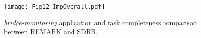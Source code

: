 \begin{figure}[t]
    \centering
    \texttt{[image: Fig12\_ImpOverall.pdf]}
    \vspace{-20pt}
    \caption{\emph{bridge-monitoring} application and task completeness comparison between REMARK and SDRB.}
    \vspace{-5pt}
    \label{fig:ImpOverall}
    \vspace{-0pt}
\end{figure}

\begin{comment}
%
\begin{figure}[t]
    \centering
    \texttt{[image: Fig12\_ImpRecover.pdf]}
    \vspace{-10pt}
    \caption{Performance comparison of REMARK and REMARK by executing \emph{bridge-monitoring} for $2$ minutes on NVnode.}
    \label{fig:ImpRecoverEvaluate}
    \vspace{-0pt}
\end{figure}

\begin{comment}
{To decouple the effect of outage rates, Fig.}~\ref{fig:ImpRecoverEvaluate}{ (a) shows an example of a typical recover procedure after one power failure, where REMARK reduces the recovery overhead by 61.8\%.}
 
\textbf{Re-initialization overhead} 
        Compared with the \emph{`init-all'} strategy in QuickRecall, REMARK reduces the re-initialization overhead from 55\% to 11\% with the \emph{`init-used'} strategy.

\textbf{B/R overhead} 
        B/R overhead represents the backup/restore overhead. Using hardware B/R functions, REMARK incurs negligible B/R time overhead.
     
\textbf{Rollback overhead} 
        The rollback overhead is a random scaled overhead which depends on the position where power failure disrupts the program. REMARK is able to complete more tasks with comparable rollback overheads of QuickRecall.


In conclusion, \emph{REMARK guarantees the reliability of I/O and peripheral operations, and the data transmission/collection completeness is improved by $9.3\times$/$2.7\times$  compared with the existing state-of-the-art software recovery strategies}.

%
\begin{figure}[t]
    \centering
    \texttt{[image: Fig13\_ImpOverheadDeadlock.pdf]}
    \vspace{-20pt}
    \caption{{Overhead and resilience analysis. (a) the overhead of wrapper code. (b) a micro case study of the worst case when the outage rate is too high. (c) a sweep analysis of recovery overhead with power failure rates.}}
    \label{fig:ImpOverheadDeadlock}
    \vspace{5}
\end{figure}
\end{comment}